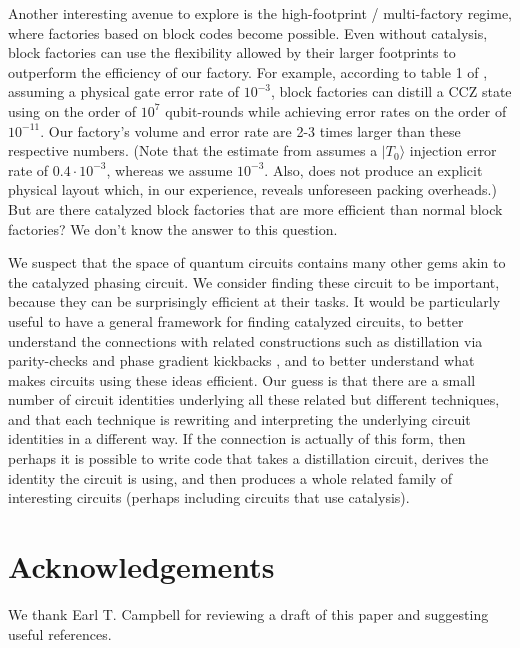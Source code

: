 \documentclass[superscriptaddress,notitlepage,longbibliography]{revtex4-1}
\begin{document}
Another interesting avenue to explore is the high-footprint / multi-factory regime, where factories based on block codes become possible.
Even without catalysis, block factories can use the flexibility allowed by their larger footprints to outperform the efficiency of our factory.
For example, according to table 1 of \cite{ogorman2017factories}, assuming a physical gate error rate of $10^{-3}$, block factories can distill a CCZ state using on the order of $10^7$ qubit-rounds while achieving error rates on the order of $10^{-11}$.
Our factory's volume and error rate are 2-3 times larger than these respective numbers.
(Note that the estimate from \cite{ogorman2017factories} assumes a $|T_0\rangle$ injection error rate of $0.4 \cdot 10^{-3}$, whereas we assume  $10^{-3}$.
Also, \cite{ogorman2017factories} does not produce an explicit physical layout which, in our experience, reveals unforeseen packing overheads.)
But are there catalyzed block factories that are more efficient than normal block factories?
We don't know the answer to this question.

We suspect that the space of quantum circuits contains many other gems akin to the catalyzed phasing circuit.
We consider finding these circuit to be important, because they can be surprisingly efficient at their tasks.
It would be particularly useful to have a general framework for finding catalyzed circuits, to better understand the connections with related constructions such as distillation via parity-checks \cite{campbell2018} and phase gradient kickbacks \cite{kitaev2002, gidney2018, nam2018}, and to better understand what makes circuits using these ideas efficient.
Our guess is that there are a small number of circuit identities underlying all these related but different techniques, and that each technique is rewriting and interpreting the underlying circuit identities in a different way.
If the connection is actually of this form, then perhaps it is possible to write code that takes a distillation circuit, derives the identity the circuit is using, and then produces a whole related family of interesting circuits (perhaps including circuits that use catalysis).


\section{Acknowledgements}

We thank Earl T. Campbell for reviewing a draft of this paper and suggesting useful references.



\end{document}
